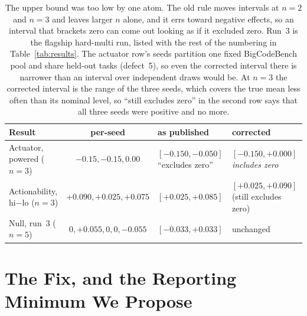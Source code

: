 \documentclass[11pt]{article}
\begin{document}
\begin{table}[h]
\centering
\small
\setlength{\tabcolsep}{5pt}
\begin{tabular}{lcp{}p{}}
\toprule
Result & per-seed & as published & corrected \\
\midrule
Actuator, powered ($n{=}3$) & $-0.15, -0.15, 0.00$ & $[-0.150,-0.050]$ ``excludes zero''
  & $\mathbf{[-0.150,+0.000]}$ \emph{includes zero} \\
Actionability, hi$-$lo ($n{=}3$) & $+0.090, +0.025, +0.075$ & $[+0.025,+0.085]$
  & $[+0.025,+0.090]$ (still excludes zero) \\
Null, run~3 ($n{=}5$) & $0,+0.055,0,0,-0.055$ & $[-0.033,+0.033]$ & unchanged \\
\bottomrule
\end{tabular}
\caption{The upper bound was too low by one atom. The old rule moves intervals at $n{=}2$ and
$n{=}3$ and leaves larger $n$ alone, and it errs toward negative effects, so an interval that
brackets zero can come out looking as if it excluded zero. Run~3 is the flagship hard-multi run, listed
with the rest of the numbering in Table~\ref{tab:results}. The actuator row's seeds partition one
fixed BigCodeBench pool and share held-out tasks (defect~5), so even the corrected interval there
is narrower than an interval over independent draws would be. At $n{=}3$ the corrected interval is
the range of the three seeds, which covers the true mean less often than its nominal level, so
``still excludes zero'' in the second row says that all three seeds were positive and no more.}
\label{tab:ciexcl}
\end{table}

\section{The Fix, and the Reporting Minimum We Propose}
\label{sec:fix}
\end{document}
